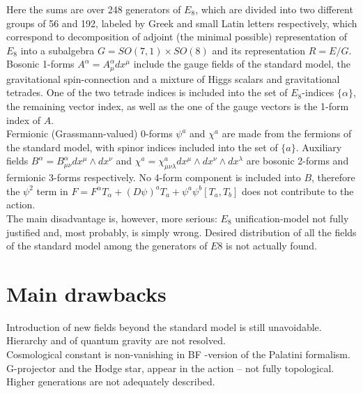 \documentclass{article}
\begin{document}
Here the sums are over 248 generators of $E_8$, which are divided into two different groups of 56 and 192, labeled by Greek and small Latin letters respectively, which correspond to decomposition of adjoint (the minimal possible) representation of $E_8$ into a subalgebra $G = SO(7,1) \times SO(8)$ and its representation $R = E/G$.\\ Bosonic 1-forms $A^\alpha = A^\alpha_\mu dx^\mu$ include the gauge fields of the standard model, the gravitational spin-connection and a mixture of Higgs scalars and gravitational tetrades. One of the two tetrade indices is included into the set of $E_8$-indices $\{\alpha\}$, the remaining vector index, as well as the one of the gauge vectors is the 1-form index of $A$. \\
Fermionic (Grassmann-valued) 0-forms $\psi^a$ and $\chi^a$ are made from the fermions of the standard model, with spinor indices included into the set of $\{a\}$. Auxiliary fields $B^\alpha = B^\alpha_{\mu\nu} dx^\mu \wedge dx^\nu$ and $\chi^a = \chi^a_{\mu\nu\lambda} dx^\mu \wedge dx^\nu \wedge dx^\lambda$ are bosonic 2-forms and fermionic 3-forms respectively. No 4-form component is included into $B$, therefore the $\psi^2$ term in $F = F^\alpha T_\alpha + (D\psi)^a T_a + \psi^a \psi^b [T_a, T_b]$ does not contribute to the action. \\
The main disadvantage is, however, more serious: $E_8$ unification-model not fully justified and, most probably, is simply wrong. Desired distribution of all the fields of the standard model among the generators of $E8$ is not actually found. \\

\newpage
\section{Main drawbacks}
Introduction of new fields beyond the standard model is still unavoidable. \\
Hierarchy and of quantum gravity are not resolved. \\
Cosmological constant is non-vanishing in BF -version of the Palatini formalism. \\
G-projector and the Hodge star, appear in the action -- not fully topological. \\
Higher generations are not adequately described. \\
\end{document}
